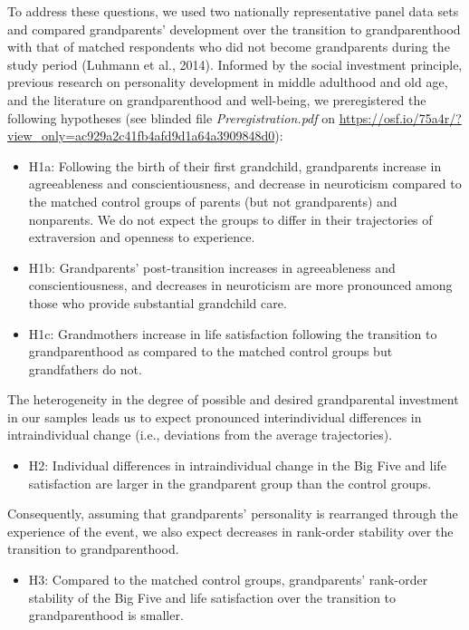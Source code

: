 \documentclass[
  english,
  man,floatsintext]{apa7}
\providecommand{\tightlist}{%
  \setlength{\itemsep}{0pt}\setlength{\parskip}{0pt}}
\begin{document}
To address these questions, we used two nationally representative panel data sets and compared grandparents' development over the transition to grandparenthood with that of matched respondents who did not become grandparents during the study period (Luhmann et al., 2014). Informed by the social investment principle, previous research on personality development in middle adulthood and old age, and the literature on grandparenthood and well-being, we preregistered the following hypotheses (see blinded file \emph{Preregistration.pdf} on \url{https://osf.io/75a4r/?view_only=ac929a2c41fb4afd9d1a64a3909848d0}):

\begin{itemize}
\tightlist
\item
  H1a: Following the birth of their first grandchild, grandparents increase in agreeableness and conscientiousness, and decrease in neuroticism compared to the matched control groups of parents (but not grandparents) and nonparents. We do not expect the groups to differ in their trajectories of extraversion and openness to experience.
\item
  H1b: Grandparents' post-transition increases in agreeableness and conscientiousness, and decreases in neuroticism are more pronounced among those who provide substantial grandchild care.
\item
  H1c: Grandmothers increase in life satisfaction following the transition to grandparenthood as compared to the matched control groups but grandfathers do not.
\end{itemize}

The heterogeneity in the degree of possible and desired grandparental investment in our samples leads us to expect pronounced interindividual differences in intraindividual change (i.e., deviations from the average trajectories).

\begin{itemize}
\tightlist
\item
  H2: Individual differences in intraindividual change in the Big Five and life satisfaction are larger in the grandparent group than the control groups.
\end{itemize}

Consequently, assuming that grandparents' personality is rearranged through the experience of the event, we also expect decreases in rank-order stability over the transition to grandparenthood.

\begin{itemize}
\tightlist
\item
  H3: Compared to the matched control groups, grandparents' rank-order stability of the Big Five and life satisfaction over the transition to grandparenthood is smaller.
\end{itemize}
\end{document}
